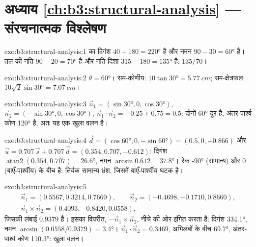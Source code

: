 \section*{अध्याय \ref{ch:b3:structural-analysis} --- संरचनात्मक विश्लेषण}

\begin{solution}{exo:b3:structural-analysis:1}
 का दिगंश $40 + 180 = \ang{220}$ है और नमन $90 - 30 = \ang{60}$ है।
तल की नति $90 - 20 = \ang{70}$ है और नति-दिशा $315 - 180 = \ang{135}$ है: $135/70$।
\end{solution}

\begin{solution}{exo:b3:structural-analysis:2}
$\theta = \ang{60}$। सम-कोणीय: $10\tan\ang{30} = \qty{5.77}{cm}$;
सम-क्षेत्रफल: $10\sqrt2\sin\ang{30} = \qty{7.07}{cm}$।
\end{solution}

\begin{solution}{exo:b3:structural-analysis:3}
$\vec n_1 = (\sin\ang{30}, 0, \cos\ang{30})$, $\vec n_2 = (-\sin\ang{30}, 0,
\cos\ang{30})$, $\vec n_1\cdot\vec n_2 = -0.25 + 0.75 = 0.5$: दोनों 
\ang{60} दूर हैं, अंतर-पार्श्व कोण \ang{120} है, अतः यह एक खुला वलन है।
\end{solution}

\begin{solution}{exo:b3:structural-analysis:4}
$\vec d = (\cos\ang{60}, 0, -\sin\ang{60}) = (0.5, 0, -0.866)$ और $\vec u =
0.707\,\vec s + 0.707\,\vec d = (0.354, 0.707, -0.612)$: दिगंश
$\operatorname{atan2}(0.354, 0.707) = \ang{26.6}$, नमन $\arcsin0.612 =
\ang{37.8}$। रेक \ang{-90} (सामान्य) और 0 (बाएँ-पार्श्वीय) के बीच है: तिर्यक
सामान्य भ्रंश, जिसमें बाएँ-पार्श्वीय घटक है।
\end{solution}

\begin{solution}{exo:b3:structural-analysis:5}
\begin{gather*}
  \vec n_1 = (0.5567, 0.3214, 0.7660),\qquad \vec n_2 = (-0.4698, -0.1710, 0.8660),\\
  \vec n_1\times\vec n_2 = (0.4093, -0.8420, 0.0558),
\end{gather*}
जिसकी लंबाई $0.9379$ है। इसका विपरीत, $-\vec n_1\times\vec n_2$, नीचे की ओर इंगित करता है:
दिगंश \ang{334.1}, नमन $\arcsin(0.0558/0.9379) = \ang{3.4}$। $\vec n_1\cdot\vec
n_2 = 0.3469$, अभिलंबों के बीच \ang{69.7}, अंतर-पार्श्व कोण \ang{110.3}:
खुला वलन।
\end{solution}


